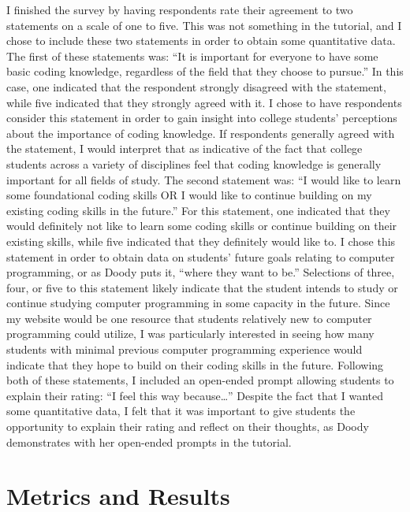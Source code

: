 \documentclass[10pt,twocolumn]{article}
\begin{document}
I finished the survey by having respondents rate their agreement to two statements on a scale of one to five. This was not something in the tutorial, and I chose to include these two statements in order to obtain some quantitative data. The first of these statements was: “It is important for everyone to have some basic coding knowledge, regardless of the field that they choose to pursue.” In this case, one indicated that the respondent strongly disagreed with the statement, while five indicated that they strongly agreed with it. I chose to have respondents consider this statement in order to gain insight into college students’ perceptions about the importance of coding knowledge. If respondents generally agreed with the statement, I would interpret that as indicative of the fact that college students across a variety of disciplines feel that coding knowledge is generally important for all fields of study. The second statement was: “I would like to learn some foundational coding skills OR I would like to continue building on my existing coding skills in the future.” For this statement, one indicated that they would definitely not like to learn some coding skills or continue building on their existing skills, while five indicated that they definitely would like to. I chose this statement in order to obtain data on students’ future goals relating to computer programming, or as Doody puts it, “where they want to be.” Selections of three, four, or five to this statement likely indicate that the student intends to study or continue studying computer programming in some capacity in the future. Since my website would be one resource that students relatively new to computer programming could utilize, I was particularly interested in seeing how many students with minimal previous computer programming experience would indicate that they hope to build on their coding skills in the future. Following both of these statements, I included an open-ended prompt allowing students to explain their rating: “I feel this way because…” Despite the fact that I wanted some quantitative data, I felt that it was important to give students the opportunity to explain their rating and reflect on their thoughts, as Doody demonstrates with her open-ended prompts in the tutorial.

\section{Metrics and Results}
\end{document}
